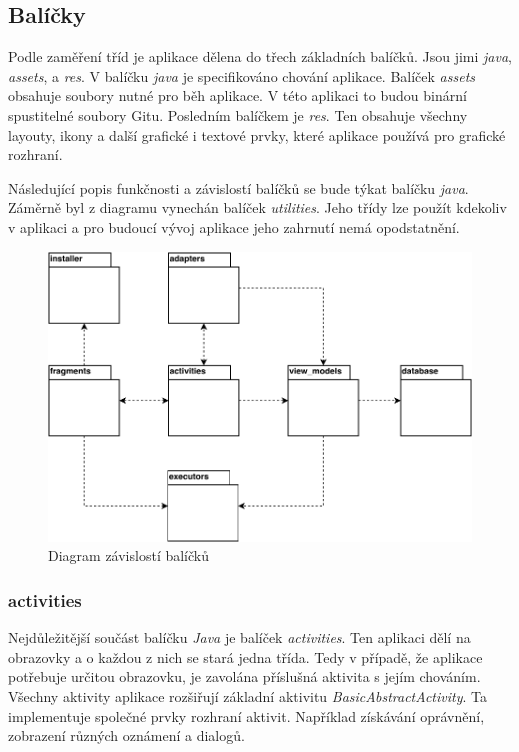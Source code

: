         \newpage
        \subsection{Balíčky}
        Podle zaměření tříd je aplikace dělena do třech základních balíčků. Jsou jimi \emph{java}, \emph{assets}, a \emph{res}. V balíčku \emph{java} je specifikováno chování aplikace. Balíček \emph{assets} obsahuje soubory nutné pro běh aplikace. V této aplikaci to budou binární spustitelné soubory Gitu. Posledním balíčkem je \emph{res}. Ten obsahuje všechny layouty, ikony a další grafické i textové prvky, které aplikace používá pro grafické rozhraní.

        Následující popis funkčnosti a závislostí balíčků se bude týkat balíčku \emph{java}. Záměrně byl z diagramu vynechán balíček \emph{utilities}. Jeho třídy lze použít kdekoliv v aplikaci a pro budoucí vývoj aplikace jeho zahrnutí nemá opodstatnění.

        \begin{figure}[h]
            \centering
            \vspace{0.5cm}
            \includegraphics[]{obrazky-figures/drawio/package_diagram.pdf}
            \caption[Diagram závislostí balíčků]{Diagram závislostí balíčků}
            \label{diagram:packages}
        \end{figure}

            \newpage
            \subsubsection{activities}
            Nejdůležitější součást balíčku \emph{Java} je balíček \emph{activities}. Ten aplikaci dělí na obrazovky a o každou z nich se stará jedna třída. Tedy v případě, že aplikace potřebuje určitou obrazovku, je zavolána příslušná aktivita s jejím chováním. Všechny aktivity aplikace rozšiřují základní aktivitu \emph{BasicAbstractActivity}. Ta implementuje společné prvky rozhraní aktivit. Například získávání oprávnění, zobrazení různých oznámení a dialogů.

